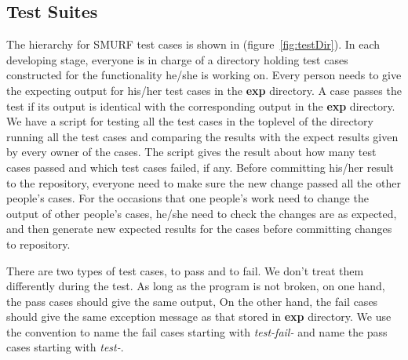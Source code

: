 \subsection{Test Suites}

The hierarchy for SMURF test cases is shown in (figure~\ref{fig:testDir}). 
In each developing stage, everyone is in charge of a directory holding test cases constructed for the functionality he/she is working on. 
Every person needs to give the expecting output for his/her test cases in the {\bf exp} directory.
A case passes the test if its output is identical with the corresponding output in the {\bf exp} directory.
We have a script for testing all the test cases in the toplevel of the directory running all the test cases and comparing the results with the expect results given by every owner of the cases. 
The script gives the result about how many test cases passed and which test cases failed, if any. 
Before committing his/her result to the repository, everyone need to make sure the new change passed all the other people's cases. 
For the occasions that one people's work need to change the output of other people's cases, 
he/she need to check the changes are as expected, 
and then generate new expected results for the cases before committing changes to repository.

There are two types of test cases, to pass and to fail. We don't treat them differently during the test.
As long as the program is not broken, on one hand, the pass cases should give the same output, 
On the other hand, the fail cases should give the same exception message as that stored in {\bf exp} directory.
We use the convention to name the fail cases starting with {\it test-fail-} and name the pass cases starting with {\it test-}.

